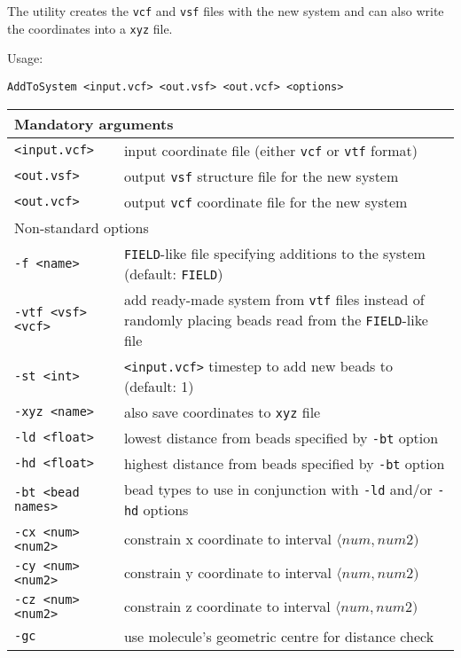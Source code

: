 The utility creates the \texttt{vcf} and \texttt{vsf} files with the new
system and can also write the coordinates into a \texttt{xyz} file.

Usage:

\vspace{1em}
\noindent
\texttt{AddToSystem <input.vcf> <out.vsf> <out.vcf> <options>}

\vspace{1em}
\noindent
\begin{longtable}{p{}p{}}
  \toprule
  \multicolumn{2}{l}{Mandatory arguments} \\
  \midrule
  \texttt{<input.vcf>} & input coordinate file (either \texttt{vcf} or
    \texttt{vtf} format) \\
  \texttt{<out.vsf>} & output \texttt{vsf} structure file for the new system \\
  \texttt{<out.vcf>} & output \texttt{vcf} coordinate file for the new
  system \\
  \toprule
  \multicolumn{2}{l}{Non-standard options} \\
  \midrule
  \texttt{-f <name>} & \texttt{FIELD}-like file specifying additions to the
    system (default: \texttt{FIELD}) \\
  \texttt{-vtf <vsf> <vcf>} & add ready-made system from \texttt{vtf} files
    instead of randomly placing beads read from the \texttt{FIELD}-like file \\
  \texttt{-st <int>} & \texttt{<input.vcf>} timestep to add new beads
    to (default: 1) \\
  \texttt{-xyz <name>} & also save coordinates to \texttt{xyz} file \\
  \texttt{-ld <float>} & lowest distance from beads specified by
    \texttt{-bt} option \\
  \texttt{-hd <float>} & highest distance from beads specified by
    \texttt{-bt} option \\
  \texttt{-bt <bead names>} & bead types to use in conjunction with
    \texttt{-ld} and/or \texttt{-hd} options \\
  \texttt{-cx <num> <num2>} & constrain x coordinate to interval
    $\langle num, num2)$ \\
  \texttt{-cy <num> <num2>} & constrain y coordinate to interval
    $\langle num, num2)$ \\
  \texttt{-cz <num> <num2>} & constrain z coordinate to interval
    $\langle num, num2)$ \\
  \texttt{-gc} & use molecule's geometric centre for distance check \\
  \bottomrule
\end{longtable}
